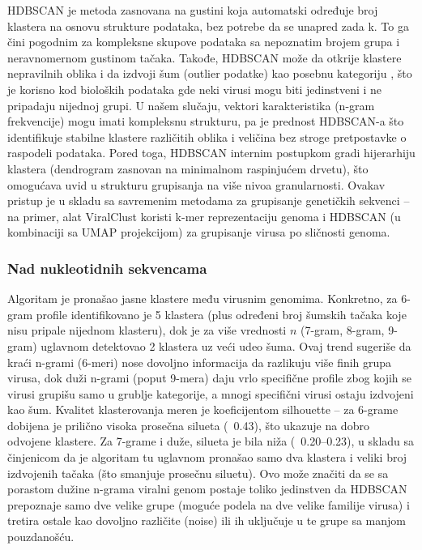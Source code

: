 \documentclass[a4paper,12pt]{article}
\begin{document}
HDBSCAN je metoda zasnovana na gustini koja automatski određuje broj klastera na osnovu strukture
podataka, bez potrebe da se unapred zada k. To ga čini pogodnim za kompleksne skupove podataka
sa nepoznatim brojem grupa i neravnomernom gustinom tačaka. Takođe, HDBSCAN može da otkrije
klastere nepravilnih oblika i da izdvoji šum (outlier podatke) kao posebnu kategoriju , što je korisno kod
bioloških podataka gde neki virusi mogu biti jedinstveni i ne pripadaju nijednoj grupi. U našem slučaju,
vektori karakteristika (n-gram frekvencije) mogu imati kompleksnu strukturu, pa je prednost HDBSCAN-a
što identifikuje stabilne klastere različitih oblika i veličina bez stroge pretpostavke o raspodeli podataka.
Pored toga, HDBSCAN internim postupkom gradi hijerarhiju klastera (dendrogram zasnovan na
minimalnom raspinjućem drvetu), što omogućava uvid u strukturu grupisanja na više nivoa granularnosti.
Ovakav pristup je u skladu sa savremenim metodama za grupisanje genetičkih sekvenci – na primer,
alat ViralClust koristi k-mer reprezentaciju genoma i HDBSCAN (u kombinaciji sa UMAP projekcijom) za
grupisanje virusa po sličnosti genoma.

\subsubsection{Nad nukleotidnih sekvencama}

Algoritam je pronašao jasne klastere među virusnim genomima. Konkretno, za 6-gram
profile identifikovano je 5 klastera (plus određeni broj šumskih tačaka koje nisu pripale nijednom klasteru),
dok je za više vrednosti $n$ (7-gram, 8-gram, 9-gram) uglavnom detektovao 2 klastera uz veći udeo šuma.
Ovaj trend sugeriše da kraći n-grami (6-meri) nose dovoljno informacija da razlikuju više finih grupa virusa,
dok duži n-grami (poput 9-mera) daju vrlo specifične profile zbog kojih se virusi grupišu samo u grublje
kategorije, a mnogi specifični virusi ostaju izdvojeni kao šum. Kvalitet klasterovanja meren je koeficijentom
silhouette – za 6-grame dobijena je prilično visoka prosečna silueta (~0.43), što ukazuje na dobro odvojene
klastere. Za 7-grame i duže, silueta je bila niža (~0.20–0.23), u skladu sa činjenicom da je algoritam tu
uglavnom pronašao samo dva klastera i veliki broj izdvojenih tačaka (što smanjuje prosečnu siluetu). Ovo
može značiti da se sa porastom dužine n-grama viralni genom postaje toliko jedinstven da HDBSCAN
prepoznaje samo dve velike grupe (moguće podela na dve velike familije virusa) i tretira ostale kao dovoljno
različite (noise) ili ih uključuje u te grupe sa manjom pouzdanošću.
\end{document}
